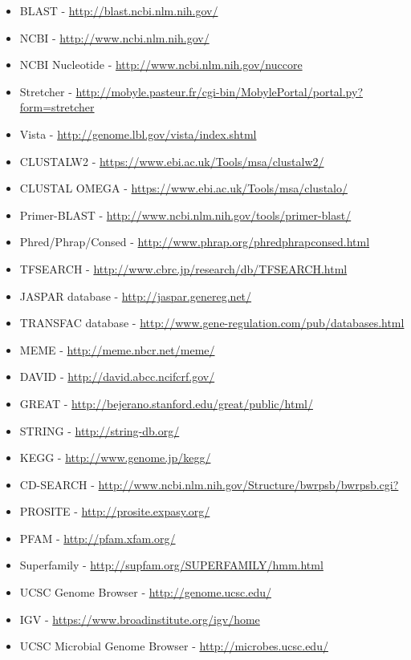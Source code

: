 \documentclass[]{article}
\begin{document}
\begin{itemize}
\itemsep1pt\parskip0pt
\item
  BLAST - \url{http://blast.ncbi.nlm.nih.gov/}
\item
  NCBI - \url{http://www.ncbi.nlm.nih.gov/}
\item
  NCBI Nucleotide - \url{http://www.ncbi.nlm.nih.gov/nuccore}
\item
  Stretcher -
  \url{http://mobyle.pasteur.fr/cgi-bin/MobylePortal/portal.py?form=stretcher}
\item
  Vista - \url{http://genome.lbl.gov/vista/index.shtml}
\item
  CLUSTALW2 - \url{https://www.ebi.ac.uk/Tools/msa/clustalw2/}
\item
  CLUSTAL OMEGA - \url{https://www.ebi.ac.uk/Tools/msa/clustalo/}
\item
  Primer-BLAST - \url{http://www.ncbi.nlm.nih.gov/tools/primer-blast/}
\item
  Phred/Phrap/Consed - \url{http://www.phrap.org/phredphrapconsed.html}
\item
  TFSEARCH - \url{http://www.cbrc.jp/research/db/TFSEARCH.html}
\item
  JASPAR database - \url{http://jaspar.genereg.net/}
\item
  TRANSFAC database -
  \url{http://www.gene-regulation.com/pub/databases.html}
\item
  MEME - \url{http://meme.nbcr.net/meme/}
\item
  DAVID - \url{http://david.abcc.ncifcrf.gov/}
\item
  GREAT - \url{http://bejerano.stanford.edu/great/public/html/}
\item
  STRING - \url{http://string-db.org/}
\item
  KEGG - \url{http://www.genome.jp/kegg/}
\item
  CD-SEARCH -
  \href{http://www.ncbi.nlm.nih.gov/Structure/bwrpsb/bwrpsb.cg\%20i?}{http://www.ncbi.nlm.nih.gov/Structure/bwrpsb/bwrpsb.cgi?}
\item
  PROSITE - \url{http://prosite.expasy.org/}
\item
  PFAM - \url{http://pfam.xfam.org/}
\item
  Superfamily - \url{http://supfam.org/SUPERFAMILY/hmm.html}
\item
  UCSC Genome Browser - \url{http://genome.ucsc.edu/}
\item
  IGV - \url{https://www.broadinstitute.org/igv/home}
\item
  UCSC Microbial Genome Browser - \url{http://microbes.ucsc.edu/}

\end{itemize}
\end{document}
